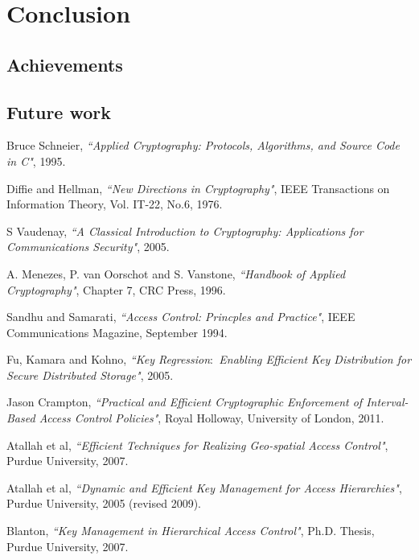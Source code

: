 \documentclass[12pt, titlepage]{article}
\begin{document}
\section{Conclusion}

\subsection{Achievements}

\subsection{Future work}

\begin{thebibliography}{10}

Bruce Schneier, \emph{``Applied Cryptography: Protocols, Algorithms, and Source Code in C"}, 1995.

Diffie and Hellman, \emph{``New Directions in Cryptography"},
IEEE Transactions on Information Theory, Vol. IT-22, No.6, 1976.

S Vaudenay, \emph{``A Classical Introduction to Cryptography: Applications for Communications Security"}, 2005.

A. Menezes, P. van Oorschot and S. Vanstone, \emph{``Handbook of Applied Cryptography"}, Chapter 7, CRC Press, 1996.

Sandhu and Samarati, \emph{``Access Control: Princples and Practice"},
IEEE Communications Magazine, September 1994.

Fu, Kamara and Kohno, \emph{``Key Regression$\colon$ Enabling Efficient Key Distribution for Secure Distributed Storage"}, 2005.

Jason Crampton, \emph{``Practical and Efficient Cryptographic Enforcement of Interval-Based
Access Control Policies"}, Royal Holloway, University of London, 2011.

Atallah et al, \emph{``Efficient Techniques for Realizing Geo-spatial Access Control"},  Purdue University, 2007.

Atallah et al, \emph{``Dynamic and Efficient Key Management for Access Hierarchies"}, Purdue University, 2005 (revised 2009).

Blanton, \emph{``Key Management in Hierarchical Access Control"}, Ph.D. Thesis, Purdue University, 2007.


\end{thebibliography}
\end{document}
